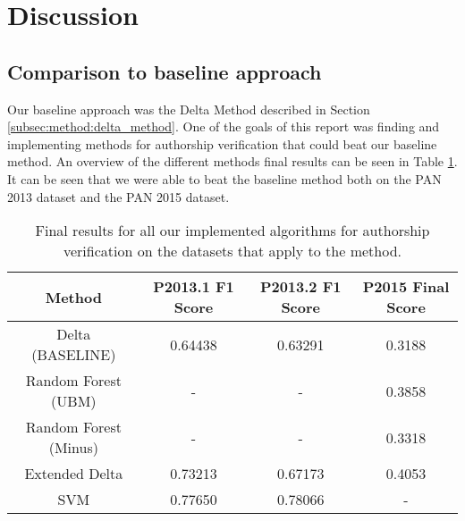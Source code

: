 \section{Discussion} \label{sec:discussion}

\subsection{Comparison to baseline approach}
Our baseline approach was the Delta Method described in Section
\ref{subsec:method:delta_method}. One of the goals of this report was finding
and implementing methods for authorship verification that could beat our
baseline method. An overview of the different methods final results can be seen
in Table \ref{tab:all_final_results}. It can be seen that we were able to beat
the baseline method both on the PAN 2013 dataset and the PAN 2015 dataset.


\begin{table}
    \centering
    \begin{tabular}{|c|c|c|c|}
    \hline
    \textbf{Method}             & \textbf{P2013.1 F1 Score} & \textbf{P2013.2 F1 Score} & \textbf{P2015 Final Score} \\ \hline
    Delta (BASELINE)            & 0.64438                      & 0.63291                      & 0.3188                        \\ \hline
    Random Forest (\gls{UBM}) & -                            & -                            & 0.3858                        \\ \hline
    Random Forest (Minus)       & -                            & -                            & 0.3318                        \\ \hline
    Extended Delta              & 0.73213                      & 0.67173                      & 0.4053                        \\ \hline
    SVM                         & 0.77650                      & 0.78066                      & -                             \\ \hline
    \end{tabular}
    \caption{Final results for all our implemented algorithms for authorship
    verification on the datasets that apply to the method.}
    \label{tab:all_final_results}
\end{table}

